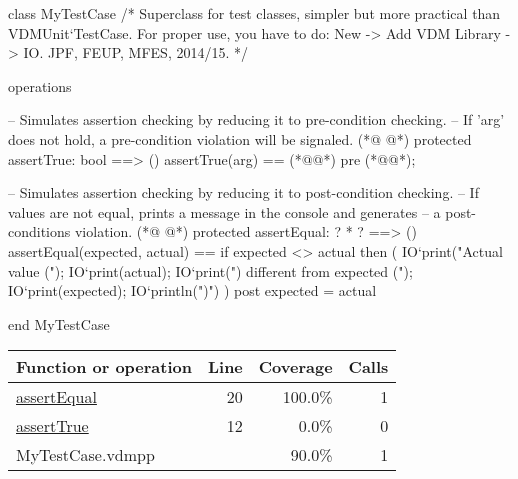 \begin{vdmpp}[breaklines=true]
class MyTestCase
/*
  Superclass for test classes, simpler but more practical than VDMUnit`TestCase. 
  For proper use, you have to do: New -> Add VDM Library -> IO.
  JPF, FEUP, MFES, 2014/15.
*/

operations

 -- Simulates assertion checking by reducing it to pre-condition checking.
 -- If 'arg' does not hold, a pre-condition violation will be signaled.
(*@
\label{assertTrue:12}
@*)
 protected assertTrue: bool ==> ()
 assertTrue(arg) == 
  (*@@*) 
 pre (*@@*);
  
 -- Simulates assertion checking by reducing it to post-condition checking.
 -- If values are not equal, prints a message in the console and generates 
 -- a post-conditions violation.
(*@
\label{assertEqual:20}
@*)
 protected assertEqual: ? * ? ==> ()
 assertEqual(expected, actual) == 
  if expected <> actual then (
     IO`print("Actual value (");
     IO`print(actual); 
     IO`print(") different from expected (");
     IO`print(expected);
     IO`println(")\n")
  )
 post expected = actual
  
end MyTestCase
\end{vdmpp}
\bigskip
\begin{longtable}{|l|r|r|r|}
\hline
Function or operation & Line & Coverage & Calls \\
\hline
\hline
\hyperref[assertEqual:20]{assertEqual} & 20&100.0\% & 1 \\
\hline
\hyperref[assertTrue:12]{assertTrue} & 12&0.0\% & 0 \\
\hline
\hline
MyTestCase.vdmpp & & 90.0\% & 1 \\
\hline
\end{longtable}

